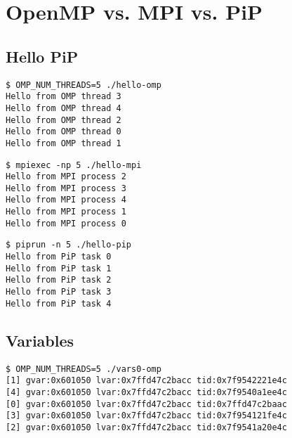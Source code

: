 
\chapter{OpenMP vs. MPI vs. PiP}

\section{Hello PiP}


\begin{lstlisting}[style=example,caption={Output of ``Hello OMP''},label=out:hello-omp]
$ OMP_NUM_THREADS=5 ./hello-omp
Hello from OMP thread 3
Hello from OMP thread 4
Hello from OMP thread 2
Hello from OMP thread 0
Hello from OMP thread 1
\end{lstlisting}


\begin{lstlisting}[style=example,caption={Output of ``Hello MPI''},label=out:hello-mpi]
$ mpiexec -np 5 ./hello-mpi
Hello from MPI process 2
Hello from MPI process 3
Hello from MPI process 4
Hello from MPI process 1
Hello from MPI process 0
\end{lstlisting}


\begin{lstlisting}[style=example,caption={Output of ``Hello PiP''},label=out:hello-pip]
$ piprun -n 5 ./hello-pip
Hello from PiP task 0
Hello from PiP task 1
Hello from PiP task 2
Hello from PiP task 3
Hello from PiP task 4
\end{lstlisting}

\section{Variables}



\begin{lstlisting}[style=example,caption={Output of ``Vars0 OMP''},label=out:vars0-omp]
$ OMP_NUM_THREADS=5 ./vars0-omp
[1] gvar:0x601050 lvar:0x7ffd47c2bacc tid:0x7f9542221e4c
[4] gvar:0x601050 lvar:0x7ffd47c2bacc tid:0x7f9540a1ee4c
[0] gvar:0x601050 lvar:0x7ffd47c2bacc tid:0x7ffd47c2baac
[3] gvar:0x601050 lvar:0x7ffd47c2bacc tid:0x7f954121fe4c
[2] gvar:0x601050 lvar:0x7ffd47c2bacc tid:0x7f9541a20e4c
\end{lstlisting}

